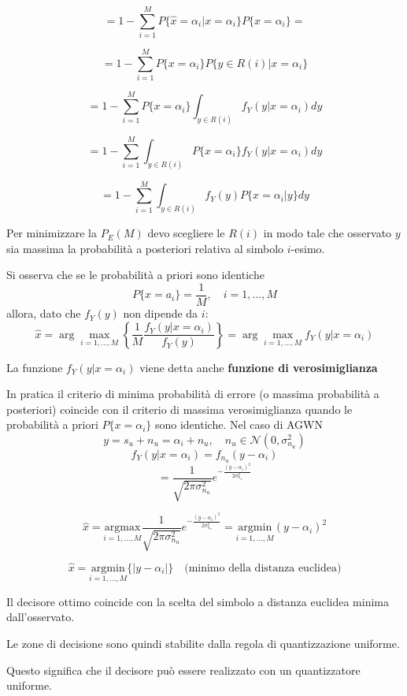 \[
    = 1 - \sum_{i=1}^M P\{\hat{x} = \alpha_i | x = \alpha_i\} P\{x = \alpha_i\} =
\]

\[
    = 1 - \sum_{i=1}^M P\{x = \alpha_i\} P\{y \in R(i) | x = \alpha_i\}
\]

\[
    = 1 - \sum_{i=1}^M P\{x = \alpha_i\} \int_{y \in R(i)} f_Y(y | x = \alpha_i) dy
\]

\[
    = 1 - \sum_{i=1}^M \int_{y \in R(i)} P\{x = \alpha_i\} f_Y(y | x = \alpha_i) dy
\]

\[
    = 1 - \sum_{i=1}^M \int_{y \in R(i)} f_Y(y) P\{x = \alpha_i | y\} dy
\]

Per minimizzare la $P_E(M)$ devo scegliere le $R(i)$ in modo tale che osservato $y$ sia massima la probabilità a posteriori relativa al simbolo $i$-esimo.

Si osserva che se le probabilità a priori sono identiche
\[
    P\{x = a_i\} = \frac{1}{M}, \quad i=1,\ldots,M
\]
allora, dato che $f_Y(y)$ non dipende da $i$:
\[
    \hat{x} = \arg \max_{i=1,\ldots,M} \left\{ \frac{1}{M} \frac{f_Y(y | x = \alpha_i)}{f_Y(y)} \right\} = \arg \max_{i=1,\ldots,M} f_Y(y | x = \alpha_i)
\]


La funzione $f_Y(y|x=\alpha_i)$ viene detta anche \textbf{funzione di verosimiglianza}

In pratica il criterio di minima probabilità di errore (o massima probabilità a posteriori) coincide con il criterio di massima verosimiglianza quando le probabilità a priori $P\{x=\alpha_i\}$ sono identiche.
Nel caso di AGWN
\[
    y = s_u + n_u = \alpha_i + n_u, \quad n_u \in \mathcal{N}(0,\sigma_{n_u}^2)
\]
\[
    f_Y(y|x = \alpha_i) = f_{n_u}(y - \alpha_i)
\]
\[
    = \frac{1}{\sqrt{2\pi\sigma_{n_u}^2}} e^{-\frac{(y-\alpha_i)^2}{2\sigma_{n_u}^2}}
\]

\[
    \hat{x} = \underset{i=1,\ldots,M}{\mathrm{argmax}} \frac{1}{\sqrt{2\pi\sigma_{n_u}^2}} e^{-\frac{(y-\alpha_i)^2}{2\sigma_{n_u}^2}} = \underset{i=1,\ldots,M}{\mathrm{argmin}}  (y - \alpha_i)^2
\]

\[
    \boxed{
        \hat{x} = \underset{i=1,\ldots,M}{\mathrm{argmin}} \{ |y-\alpha_i| \}
    } \quad \text{(minimo della distanza euclidea)}
\]


Il decisore ottimo coincide con la scelta del simbolo a distanza euclidea minima dall'osservato.

Le zone di decisione sono quindi stabilite dalla regola di quantizzazione uniforme.

Questo significa che il decisore può essere realizzato con un quantizzatore uniforme.


